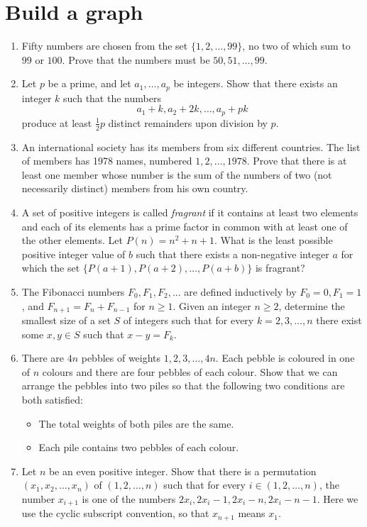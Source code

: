 \documentclass{article}
\begin{document}
\section{Build a graph}
\begin{enumerate}
    \item Fifty numbers are chosen from the set $\{1,2,\ldots,99\}$, no two of
        which sum to $99$ or $100$. Prove that the numbers must be
        $50,51,\ldots,99$.
    \item Let $p$ be a prime, and let $a_1, \dots, a_p$ be integers. Show that
        there exists an integer $k$ such that the numbers
        \[a_1 + k, a_2 + 2k, \dots, a_p + pk\]produce at least $\tfrac{1}{2} p$
        distinct remainders upon division by $p$.
    \item An international society has its members from six different
        countries. The list of members has 1978 names, numbered $1, 2,
        \ldots, 1978$. Prove that there is at least one member whose
        number is the sum of the numbers of two (not necessarily
    distinct) members from his own country. 
\item A set of positive integers is called \emph{fragrant} if it contains at least two
    elements and each of its elements has a prime factor in common with at least
    one of the other elements. Let $P(n)=n^2+n+1$. What is the least possible
    positive integer value of $b$ such that there exists a non-negative integer
    $a$ for which the set $\{P(a+1),P(a+2),\ldots,P(a+b)\}$ is fragrant?
    \item The Fibonacci numbers $F_0, F_1, F_2, . . .$ are defined inductively
        by $F_0=0, F_1=1$, and $F_{n+1}=F_n+F_{n-1}$ for $n \ge 1$. Given an
        integer $n \ge 2$, determine the smallest size of a set $S$ of integers
        such that for every $k=2, 3, \ldots , n$ there exist some $x, y \in S$
        such that $x-y=F_k$.
    \item  There are $4n$ pebbles of weights $1, 2, 3, \dots, 4n.$ Each pebble
        is coloured in one of $n$ colours and there are four pebbles of each
        colour. Show that we can arrange the pebbles into two piles so that the
        following two conditions are both satisfied:

        \begin{itemize}
            \item 
            The total weights of both piles are the same.
            \item
                Each pile contains two pebbles of each colour.
        \end{itemize}
    \item Let $n$ be an even positive integer. Show that there is a permutation 
        $(x_1, x_2, \ldots, x_n)$ of $(1, 2, \ldots, n)$ such that for every $i \in (1, 2, \ldots,
        n)$,
        the 
        number $x_{i+1}$ is one of the numbers $2x_i, 2x_i-1, 2x_i-n, 2x_i-n-1$. Here 
        we use the cyclic subscript convention, so that $x_{n+1}$ means $x_1$.  
\end{enumerate}
\end{document}

